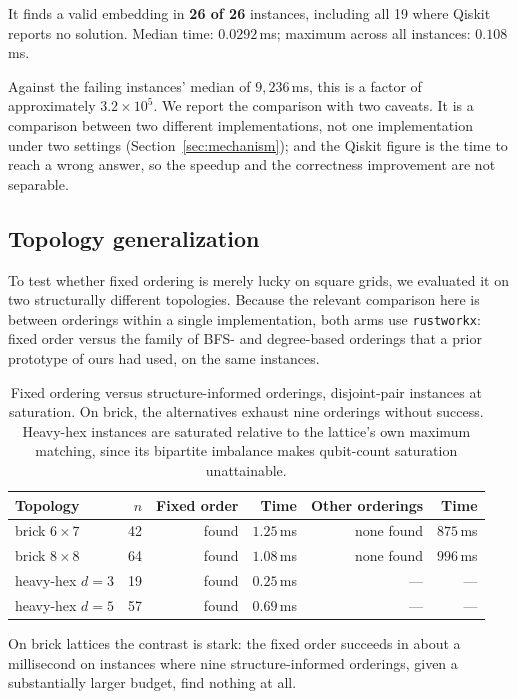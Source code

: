 \documentclass[11pt]{article}
\begin{document}
It finds a valid embedding in \textbf{26 of 26} instances, including
all 19 where Qiskit reports no solution. Median time: $0.0292$\,ms;
maximum across all instances: $0.108$\,ms.

Against the failing instances' median of $9{,}236$\,ms, this is a
factor of approximately $3.2 \times 10^{5}$. We report the comparison
with two caveats. It is a comparison between two different
implementations, not one implementation under two settings
(Section~\ref{sec:mechanism}); and the Qiskit figure is the time to
reach a wrong answer, so the speedup and the correctness improvement
are not separable.

\subsection{Topology generalization}

To test whether fixed ordering is merely lucky on square grids, we
evaluated it on two structurally different topologies. Because the
relevant comparison here is between orderings within a single
implementation, both arms use \texttt{rustworkx}: fixed order versus
the family of BFS- and degree-based orderings that a prior prototype of
ours had used, on the same instances.

\begin{table}[h]
\centering
\begin{tabular}{lrrrrr}
\toprule
Topology & $n$ & Fixed order & Time & Other orderings & Time \\
\midrule
brick $6\times7$ & 42 & found & $1.25$\,ms & none found & $875$\,ms \\
brick $8\times8$ & 64 & found & $1.08$\,ms & none found & $996$\,ms \\
heavy-hex $d{=}3$ & 19 & found & $0.25$\,ms & --- & --- \\
heavy-hex $d{=}5$ & 57 & found & $0.69$\,ms & --- & --- \\
\bottomrule
\end{tabular}
\caption{Fixed ordering versus structure-informed orderings, disjoint-pair
instances at saturation. On brick, the alternatives exhaust nine
orderings without success. Heavy-hex instances are saturated relative
to the lattice's own maximum matching, since its bipartite imbalance
makes qubit-count saturation unattainable.}
\label{tab:topology}
\end{table}

On brick lattices the contrast is stark: the fixed order succeeds in
about a millisecond on instances where nine structure-informed
orderings, given a substantially larger budget, find nothing at all.
\end{document}
